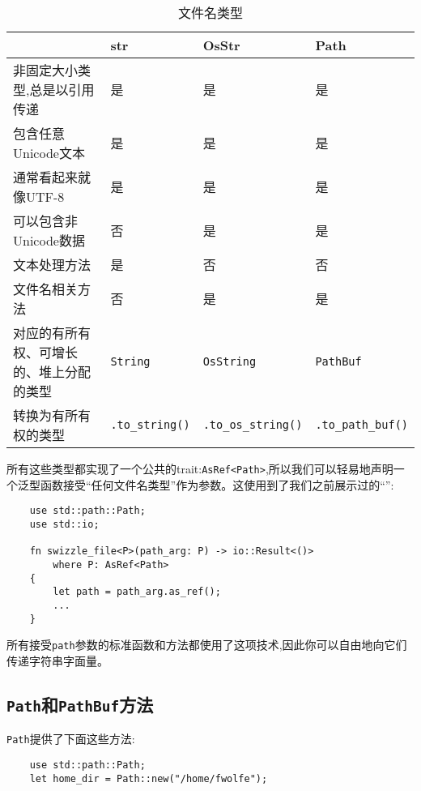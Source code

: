 \begin{table}[htbp]
    \centering
    \caption{文件名类型}
    \label{t18-1}
    \begin{tabular}{llll}
        \hline
        & \textbf{str} & \textbf{OsStr} & \textbf{Path} \\
        \hline
        非固定大小类型,总是以引用传递 & 是 & 是 & 是 \\
        \rowcolor{tablecolor}
        包含任意Unicode文本 & 是 & 是 & 是 \\
        通常看起来就像UTF-8 & 是 & 是 & 是 \\
        \rowcolor{tablecolor}
        可以包含非Unicode数据 & 否 & 是 & 是 \\
        文本处理方法    & 是 & 否 & 否 \\
        \rowcolor{tablecolor}
        文件名相关方法  & 否 & 是 & 是 \\
        对应的有所有权、可增长的、堆上分配的类型 & \texttt{String} & \texttt{OsString} & \texttt{PathBuf} \\
        \rowcolor{tablecolor}
        转换为有所有权的类型  & \texttt{.to\_string()} & \texttt{.to\_os\_string()} & \texttt{.to\_path\_buf()} \\
    \end{tabular}
\end{table}

所有这些类型都实现了一个公共的trait:\texttt{AsRef<Path>},所以我们可以轻易地声明一个泛型函数接受“任何文件名类型”作为参数。这使用到了我们之前展示过的“”:
\begin{verbatim}
    use std::path::Path;
    use std::io;

    fn swizzle_file<P>(path_arg: P) -> io::Result<()>
        where P: AsRef<Path>
    {
        let path = path_arg.as_ref();
        ...
    }
\end{verbatim}

所有接受\texttt{path}参数的标准函数和方法都使用了这项技术,因此你可以自由地向它们传递字符串字面量。

\subsection{\texttt{Path}和\texttt{PathBuf}方法}
\texttt{Path}提供了下面这些方法:
\begin{verbatim}
    use std::path::Path;
    let home_dir = Path::new("/home/fwolfe");
\end{verbatim}


